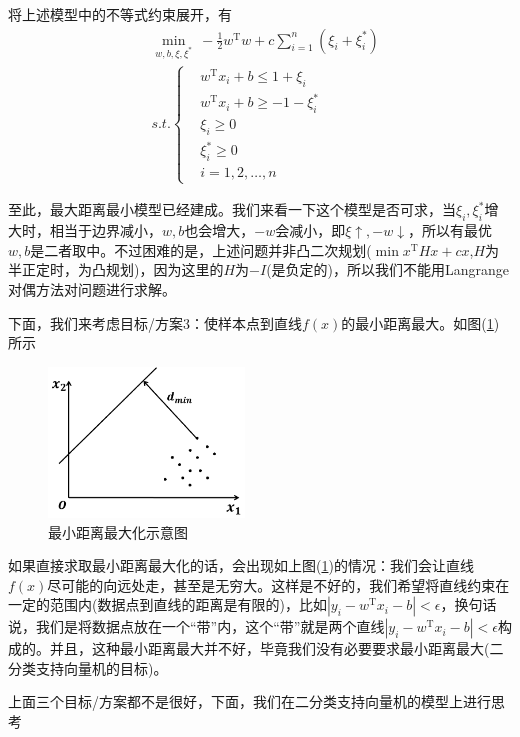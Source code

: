     将上述模型中的不等式约束展开，有
    \begin{align*}
    & \min_{w,b,\xi,\xi^*} \ -\frac{1}{2}w^\mathrm{T}w +c \sum_{i=1}^n( \xi_i+\xi_i^*)\\
    & s.t.\left\{
    \begin{aligned}
    & w^\mathrm{T}x_i+b \leqslant 1+\xi_i\\
    & w^\mathrm{T}x_i+b \geqslant -1-\xi_i^*\\
    & \xi_i \geqslant 0\\
    & \xi_i^* \geqslant 0\\
    & i=1,2,\dots,n
    \end{aligned}
    \right.
    \end{align*}
    \par
    至此，最大距离最小模型已经建成。我们来看一下这个模型是否可求，当$\xi_i,\xi_i^*$增大时，相当于边界减小，$w,b$也会增大，$-w$会减小，即$\xi \uparrow,-w\downarrow$，所以有最优$w,b$是二者取中。不过困难的是，上述问题并非凸二次规划($\min x^\mathrm{T}Hx+cx$,$H$为半正定时，为凸规划)，因为这里的$H$为$-I$(是负定的)，所以我们不能用Langrange对偶方法对问题进行求解。
    \par
    下面，我们来考虑目标/方案3：使样本点到直线$f(x)$的最小距离最大。如图(\ref{最小距离最大化示意图})所示
            \begin{figure}[H]
            \centering
            \includegraphics[height=4cm]{images/mindistance_max.jpg}
            \caption{最小距离最大化示意图}
            \label{最小距离最大化示意图}
            \end{figure}
    如果直接求取最小距离最大化的话，会出现如上图(\ref{最小距离最大化示意图})的情况：我们会让直线$f(x)$尽可能的向远处走，甚至是无穷大。这样是不好的，我们希望将直线约束在一定的范围内(数据点到直线的距离是有限的)，比如$|y_i - w^\mathrm{T}x_i-b| < \epsilon$，换句话说，我们是将数据点放在一个“带”内，这个“带”就是两个直线$|y_i - w^\mathrm{T}x_i-b| < \epsilon$构成的。并且，这种最小距离最大并不好，毕竟我们没有必要要求最小距离最大(二分类支持向量机的目标)。
    \par
    上面三个目标/方案都不是很好，下面，我们在二分类支持向量机的模型上进行思考
